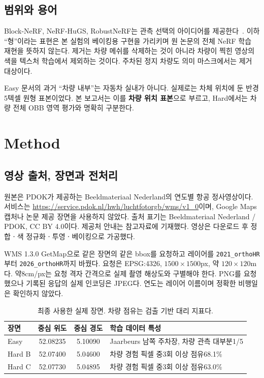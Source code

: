 \documentclass[11pt,a4paper]{article}
\begin{document}
\subsection{범위와 용어}
Block-NeRF, NeRF-HuGS, RobustNeRF는 관측 선택의 아이디어를 제공한다~\cite{block,hugs,robust}. 이하 ``형''이라는 표현은 본 실험의 베이킹용 구현을 가리키며 원 논문의 전체 NeRF 학습 재현을 뜻하지 않는다. 제거는 차량 메쉬를 삭제하는 것이 아니라 차량이 찍힌 영상의 색을 텍스처 학습에서 제외하는 것이다. 주차된 정지 차량도 의미 마스크에서는 제거 대상이다.

Easy 문서의 과거 ``차량 내부''는 자동차 실내가 아니다. 실제로는 차체 위치에 둔 반경5텍셀 원형 표본이었다. 본 보고서는 이를 \textbf{차량 위치 표본}으로 부르고, Hard에서는 차량 전체 OBB 영역 평가와 명확히 구분한다.

\section{Method}
\subsection{영상 출처, 장면과 전처리}
원본은 PDOK가 제공하는 Beeldmateriaal Nederland의 연도별 항공 정사영상이다. 서비스는
\url{https://service.pdok.nl/hwh/luchtfotorgb/wms/v1_0}이며, Google Maps 캡처나 논문 제공 장면을 사용하지 않았다. 출처 표기는 Beeldmateriaal Nederland / PDOK, CC BY 4.0이다. 제공처 안내는 참고자료에 기재했다. 영상은 다운로드 후 정합ㆍ색 정규화ㆍ투영ㆍ베이킹으로 가공했다.

WMS 1.3.0 GetMap으로 같은 장면의 같은 bbox를 요청하고 레이어를 \texttt{2021\_orthoHR}부터 \texttt{2026\_orthoHR}까지 바꿨다. 요청은 EPSG:4326, $1500\times1500$px, 약 $120\times120$m다. 약8cm/px는 요청 격자 간격으로 실제 촬영 해상도와 구별해야 한다. PNG를 요청했으나 기록된 응답의 실제 인코딩은 JPEG다. 연도는 레이어 이름이며 정확한 비행일은 확인하지 않았다.

\begin{table}[htbp]\centering\small
\caption{최종 사용한 실제 장면. 차량 점유는 검출 기반 대리 지표다.}\label{tab:data}
\begin{tabular}{lccp{57mm}}
\toprule 장면 & 중심 위도 & 중심 경도 & 학습 데이터 특성\\\midrule
Easy & 52.08235 & 5.10090 & Jaarbeurs 남쪽 주차장, 차량 관측 대부분1/5\\
Hard B & 52.07400 & 5.04600 & 차량 경험 픽셀 중3회 이상 점유68.1\%\\
Hard C & 52.07730 & 5.04895 & 차량 경험 픽셀 중3회 이상 점유63.0\%\\\bottomrule
\end{tabular}\end{table}
\end{document}
